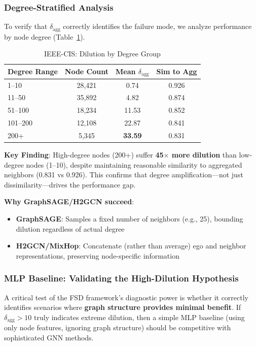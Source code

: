 \subsubsection{Degree-Stratified Analysis}

To verify that $\delta_{\text{agg}}$ correctly identifies the failure mode, we analyze performance by node degree (Table~\ref{tab:ieee_cis_degree}).

\begin{table}[t]
\centering
\caption{IEEE-CIS: Dilution by Degree Group}
\label{tab:ieee_cis_degree}
\small
\begin{tabular}{lccc}
\toprule
\textbf{Degree Range} & \textbf{Node Count} & \textbf{Mean $\delta_{\text{agg}}$} & \textbf{Sim to Agg} \\
\midrule
1--10 & 28,421 & 0.74 & 0.926 \\
11--50 & 35,892 & 4.82 & 0.874 \\
51--100 & 18,234 & 11.53 & 0.852 \\
101--200 & 12,108 & 22.87 & 0.841 \\
200+ & 5,345 & \textbf{33.59} & 0.831 \\
\bottomrule
\end{tabular}
\end{table}

\textbf{Key Finding}: High-degree nodes (200+) suffer \textbf{45$\times$ more dilution} than low-degree nodes (1--10), despite maintaining reasonable similarity to aggregated neighbors (0.831 vs 0.926). This confirms that degree amplification---not just dissimilarity---drives the performance gap.

\textbf{Why GraphSAGE/H2GCN succeed}:
\begin{itemize}
\item \textbf{GraphSAGE}: Samples a fixed number of neighbors (e.g., 25), bounding dilution regardless of actual degree
\item \textbf{H2GCN/MixHop}: Concatenate (rather than average) ego and neighbor representations, preserving node-specific information
\end{itemize}

\subsubsection{MLP Baseline: Validating the High-Dilution Hypothesis}

A critical test of the FSD framework's diagnostic power is whether it correctly identifies scenarios where \textbf{graph structure provides minimal benefit}. If $\delta_{\text{agg}} > 10$ truly indicates extreme dilution, then a simple MLP baseline (using only node features, ignoring graph structure) should be competitive with sophisticated GNN methods.

